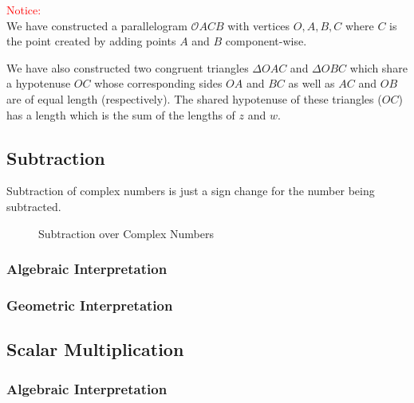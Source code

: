 \documentclass[10pt]{article}
\begin{document}
\textcolor{red}{Notice:} \\
We have constructed a parallelogram $\mathcal{O}ACB$ with vertices $O, A, B, C$ where $C$ is the point created by adding points $A$ and $B$ component-wise.

We have also constructed two congruent triangles $\Delta OAC$ and $\Delta OBC$ which share a hypotenuse $OC$ whose corresponding sides $OA$ and $BC$ as well as $AC$ and $OB$ are of equal length (respectively). The shared hypotenuse of these triangles ($OC$) has a length which is the sum of the lengths of $z$ and $w$.

\subsection*{Subtraction}
\label{subsec:subtract}
Subtraction of complex numbers is just a sign change for the number being subtracted.

\begin{figure}[h!]
\begin{center}
\caption{Subtraction over Complex Numbers}
\end{center}
\end{figure}

\subsubsection*{Algebraic Interpretation}

\subsubsection*{Geometric Interpretation}

\subsection*{Scalar Multiplication}
\label{subsec:scalar}
\subsubsection*{Algebraic Interpretation}
\end{document}
